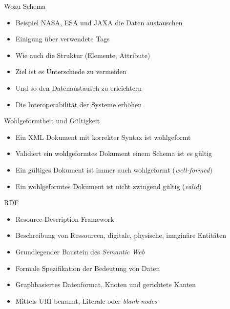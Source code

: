\documentclass{beamer}
\begin{document}
\begin{frame}{Wozu Schema}
	
	\begin{itemize}
		\item Beispiel NASA, ESA und JAXA die Daten austauschen
		\item Einigung über verwendete Tags
		\item Wie auch die Struktur (Elemente, Attribute)
		\item Ziel ist es Unterschiede zu vermeiden
		\item Und so den Datenaustausch zu erleichtern
		\item Die Interoperabilität der Systeme erhöhen
	\end{itemize}
	
\end{frame}

\begin{frame}{Wohlgeformtheit und Gültigkeit}
	
	\begin{itemize}
		\item Ein XML Dokument mit korrekter Syntax ist wohlgeformt
		\item Validiert ein wohlgeformtes Dokument einem Schema ist es gültig
		\item Ein gültiges Dokument ist immer auch wohlgeformt (\emph{well-formed})
		\item Ein wohlgeformtes Dokument ist nicht zwingend gültig (\emph{valid})
	\end{itemize}
	
\end{frame}

\begin{frame}{RDF}
	
	\begin{itemize}
		\item Resource Description Framework
		\item Beschreibung von Ressourcen, digitale, physische, imaginäre Entitäten
		\item Grundlegender Baustein des \emph{Semantic Web}
		\item Formale Spezifikation der Bedeutung von Daten
		\item Graphbasiertes Datenformat, Knoten und gerichtete Kanten
		\item Mittels URI benannt, Literale oder \emph{blank nodes}
	\end{itemize}
	
\end{frame}
\end{document}
